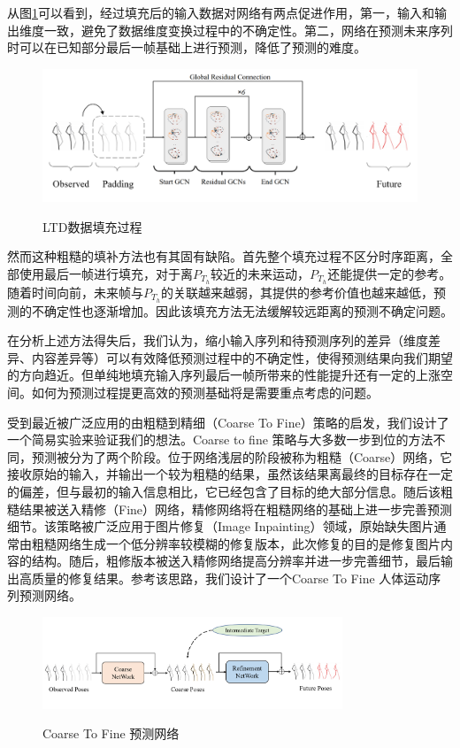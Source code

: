 从图\ref{fig:LTD_padding}可以看到，经过填充后的输入数据对网络有两点促进作用，第一，输入和输出维度一致，避免了数据维度变换过程中的不确定性。第二，网络在预测未来序列时可以在已知部分最后一帧基础上进行预测，降低了预测的难度。
\begin{figure}[ht]
    \centering
    \includegraphics[width=1\textwidth]{FigMa/LTD_padding.png}\\
    \vspace{-0.3cm}
    \caption{LTD数据填充过程}
    \label{fig:LTD_padding}
\end{figure}
然而这种粗糙的填补方法也有其固有缺陷。首先整个填充过程不区分时序距离，全部使用最后一帧进行填充，对于离$P_{T_h}$较近的未来运动，$P_{T_h}$还能提供一定的参考。随着时间向前，未来帧与$P_{T_h}$的关联越来越弱，其提供的参考价值也越来越低，预测的不确定性也逐渐增加。因此该填充方法无法缓解较远距离的预测不确定问题。

在分析上述方法得失后，我们认为，缩小输入序列和待预测序列的差异（维度差异、内容差异等）可以有效降低预测过程中的不确定性，使得预测结果向我们期望的方向趋近。但单纯地填充输入序列最后一帧所带来的性能提升还有一定的上涨空间。如何为预测过程提更高效的预测基础将是需要重点考虑的问题。

受到最近被广泛应用的由粗糙到精细（Coarse To Fine）策略的启发，我们设计了一个简易实验来验证我们的想法。Coarse to fine 策略与大多数一步到位的方法不同，预测被分为了两个阶段。位于网络浅层的阶段被称为粗糙（Coarse）网络，它接收原始的输入，并输出一个较为粗糙的结果，虽然该结果离最终的目标存在一定的偏差，但与最初的输入信息相比，它已经包含了目标的绝大部分信息。随后该粗糙结果被送入精修（Fine）网络，精修网络将在粗糙网络的基础上进一步完善预测细节。该策略被广泛应用于图片修复（Image Inpainting）\parencite{yu2018generative,zamir2021multi}领域，原始缺失图片通常由粗糙网络生成一个低分辨率较模糊的修复版本，此次修复的目的是修复图片内容的结构。随后，粗修版本被送入精修网络提高分辨率并进一步完善细节，最后输出高质量的修复结果。参考该思路，我们设计了一个Coarse To Fine 人体运动序列预测网络。

\begin{figure}[ht]
    \centering
    \includegraphics[width=0.8\textwidth]{FigMa/Two_stage.png}\\
    \vspace{-0.3cm}
    \caption{Coarse To Fine 预测网络}
    \label{fig:Two_stage}
\end{figure}

